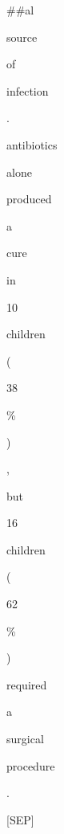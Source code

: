 \documentclass[varwidth]{standalone}
\begin{document}
\begin{CJK*}{UTF8}{gbsn}
{{{\colorbox{red! 19.48099981}{\strut \#\#al} \colorbox{red! 20.69588787}{\strut source} \colorbox{red! 56.32329714}{\strut of} \colorbox{red! 43.03113855}{\strut infection} \colorbox{red! 27.04265643}{\strut .} \colorbox{red! 2.67436959}{\strut antibiotics} \colorbox{red! 1.48485517}{\strut alone} \colorbox{red! 20.46796477}{\strut produced} \colorbox{red! 38.36041435}{\strut a} \colorbox{red! 2.71014811}{\strut cure} \colorbox{red! 38.19227063}{\strut in} \colorbox{red! 9.62523718}{\strut 10} \colorbox{red! 17.85596656}{\strut children} \colorbox{red! 42.36172955}{\strut (} \colorbox{red! 3.93145911}{\strut 38} \colorbox{red! 30.07940066}{\strut \%} \colorbox{red! 36.74170512}{\strut )} \colorbox{red! 30.37199422}{\strut ,} \colorbox{red! 15.11504515}{\strut but} \colorbox{red! 0.00000000}{\strut 16} \colorbox{red! 13.72185098}{\strut children} \colorbox{red! 36.70968414}{\strut (} \colorbox{red! 2.75862897}{\strut 62} \colorbox{red! 40.81911021}{\strut \%} \colorbox{red! 45.08147392}{\strut )} \colorbox{red! 16.53665212}{\strut required} \colorbox{red! 39.14124754}{\strut a} \colorbox{red! 15.32918604}{\strut surgical} \colorbox{red! 10.89312796}{\strut procedure} \colorbox{red! 3.38303144}{\strut .} \colorbox{red! 3.38262924}{\strut [SEP]} \n}}}
\end{CJK*}
\end{document}
